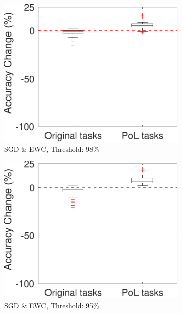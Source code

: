 \begin{figure}[!t]
    \centering
    \begin{subfigure}{.3\textwidth}
        \includegraphics[width=1\textwidth]{other/figures/98-115-4_v5.pdf}
        \caption{SGD \& EWC, Threshold: 98\%}
        \label{98_box}
    \end{subfigure}
    \begin{subfigure}{.3\textwidth}
        \includegraphics[width=1\textwidth]{other/figures/95-116-4_v3.pdf}
        \caption{SGD \& EWC, Threshold: 95\%}
        \label{95_box}
    \end{subfigure}
    \begin{subfigure}{.3\textwidth}

\end{subfigure}
\end{figure}
